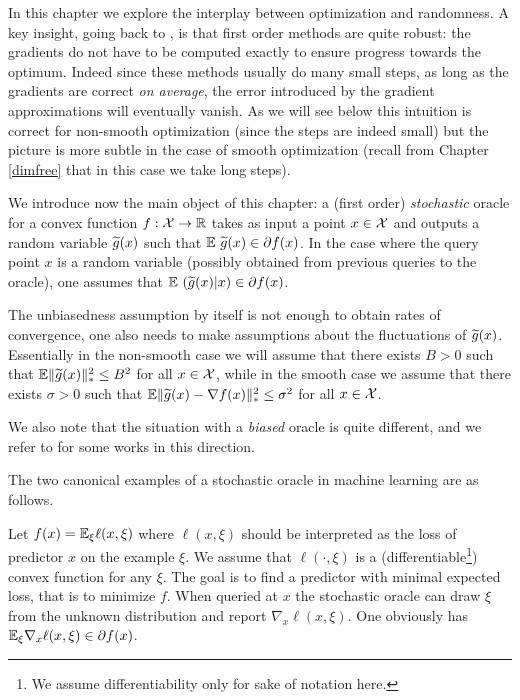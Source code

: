 In this chapter we explore the interplay between optimization and randomness. A key insight, going back to \cite{RM51}, is that first order methods are quite robust: the gradients do not have to be computed exactly to ensure progress towards the optimum. Indeed since these methods usually do many small steps, as long as the gradients are correct {\em on average}, the error introduced by the gradient approximations will eventually vanish. As we will see below this intuition is correct for non-smooth optimization (since the steps are indeed small) but the picture is more subtle in the case of smooth optimization (recall from Chapter \ref{dimfree} that in this case we take long steps).

We introduce now the main object of this chapter: a (first order) {\em stochastic} oracle for a convex function $f : \mathcal{X} \rightarrow \mathbb{R}$ takes as input a point $x \in \mathcal{X}$ and outputs a random variable $\widetilde{g}(x)$ such that $\mathbb{E} \ \widetilde{g}(x) \in \partial f(x)$. In the case where the query point $x$ is a random variable (possibly obtained from previous queries to the oracle), one assumes that $\mathbb{E} \ (\widetilde{g}(x) | x) \in \partial f(x)$.

The unbiasedness assumption by itself is not enough to obtain rates of convergence, one also needs to make assumptions about the fluctuations of $\widetilde{g}(x)$.  Essentially in the non-smooth case we will assume that there exists $B >0$ such that $\mathbb{E} \|\widetilde{g}(x)\|_*^2 \leq B^2$ for all $x \in \mathcal{X}$, while in the smooth case we assume that there exists $\sigma > 0$ such that  $\mathbb{E} \|\widetilde{g}(x) - \nabla f(x)\|_*^2 \leq \sigma^2$ for all $x \in \mathcal{X}$.

We also note that the situation with a {\em biased} oracle is quite different, and we refer to \cite{Asp08, SLRB11} for some works in this direction.

The two canonical examples of a stochastic oracle in machine learning are as follows. 

Let $f(x) = \mathbb{E}_{\xi} \ell(x, \xi)$ where $\ell(x, \xi)$ should be interpreted as the loss of predictor $x$ on the example $\xi$. We assume that $\ell(\cdot, \xi)$ is a (differentiable\footnote{We assume differentiability only for sake of notation here.}) convex function for any $\xi$. The goal is to find a predictor with minimal expected loss, that is to minimize $f$. When queried at $x$ the stochastic oracle can draw $\xi$ from the unknown distribution and report $\nabla_x \ell(x, \xi)$. One obviously has $\mathbb{E}_{\xi} \nabla_x \ell(x, \xi) \in \partial f(x)$. 

